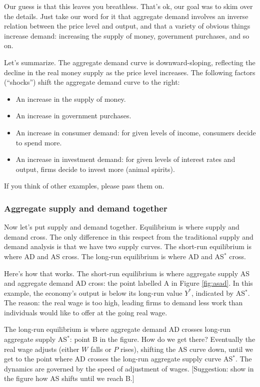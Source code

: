 \documentclass[letterpaper,12pt]{article}
\begin{document}
Our guess is that this leaves you breathless.
That's ok, our goal was to skim over the details.
Just take our word for it that aggregate demand involves an
inverse relation between the price level and output,
and that a variety of obvious things increase demand:
increasing the supply of money, government purchases,
and so on.

Let's summarize.
The aggregate demand curve is downward-sloping, reflecting
the decline in the real money supply as the price level increases.
The following factors (``shocks'')
shift the aggregate demand curve to the right:
%
\begin{itemize}
\item An increase in the supply of money.
\item An increase in government purchases.
\item An increase in consumer demand:  for given levels of income,
consumers decide to spend more.
\item An increase in investment demand:
for given levels of interest rates and output,
firms decide to invest more (animal spirits).
\end{itemize}
%
If you think of other examples, please pass them on.

\subsubsection*{Aggregate supply and demand together}

Now let's put supply and demand together.
Equilibrium is where supply and demand cross.
The only difference in this respect from
the traditional supply and demand analysis is that we have two
supply curves.
The short-run equilibrium is where AD and AS cross.
The long-run equilibrium is where AD and AS$^*$ cross.

Here's how that works.
The short-run equilibrium is where aggregate supply AS and aggregate
demand AD cross:  the point labelled A in Figure \ref{fig:asad}.
In this example, the economy's output is below its long-run
value $Y^*$, indicated by AS$^*$.
The reason:  the real wage is too high, leading firms to demand
less work than individuals would like to offer at the going real wage.

The long-run equilibrium is where aggregate demand AD crosses
long-run aggregate supply AS$^*$:  point B in the figure.
How do we get there?
Eventually the real wage adjusts (either $W$ falls or $P$ rises),
shifting the AS curve down, until
we get to the point where AD crosses the long-run aggregate supply
curve AS$^*$.
The dynamics are governed by the speed of adjustment of wages.
[Suggestion: show in the figure how AS shifts until we reach B.]
\end{document}
